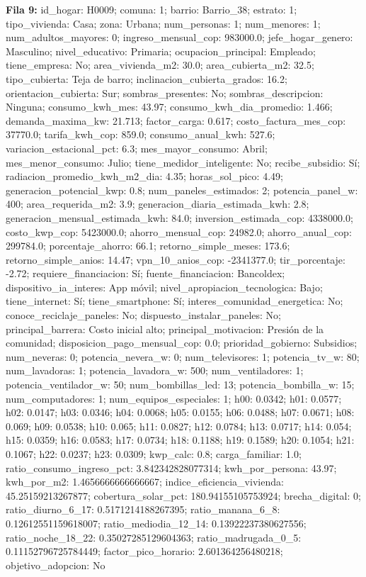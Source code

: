 {\footnotesize\textbf{Fila 9:} id\_hogar: H0009; comuna: 1; barrio: Barrio\_38; estrato: 1; tipo\_vivienda: Casa; zona: Urbana; num\_personas: 1; num\_menores: 1; num\_adultos\_mayores: 0; ingreso\_mensual\_cop: 983000.0; jefe\_hogar\_genero: Masculino; nivel\_educativo: Primaria; ocupacion\_principal: Empleado; tiene\_empresa: No; area\_vivienda\_m2: 30.0; area\_cubierta\_m2: 32.5; tipo\_cubierta: Teja de barro; inclinacion\_cubierta\_grados: 16.2; orientacion\_cubierta: Sur; sombras\_presentes: No; sombras\_descripcion: Ninguna; consumo\_kwh\_mes: 43.97; consumo\_kwh\_dia\_promedio: 1.466; demanda\_maxima\_kw: 21.713; factor\_carga: 0.617; costo\_factura\_mes\_cop: 37770.0; tarifa\_kwh\_cop: 859.0; consumo\_anual\_kwh: 527.6; variacion\_estacional\_pct: 6.3; mes\_mayor\_consumo: Abril; mes\_menor\_consumo: Julio; tiene\_medidor\_inteligente: No; recibe\_subsidio: Sí; radiacion\_promedio\_kwh\_m2\_dia: 4.35; horas\_sol\_pico: 4.49; generacion\_potencial\_kwp: 0.8; num\_paneles\_estimados: 2; potencia\_panel\_w: 400; area\_requerida\_m2: 3.9; generacion\_diaria\_estimada\_kwh: 2.8; generacion\_mensual\_estimada\_kwh: 84.0; inversion\_estimada\_cop: 4338000.0; costo\_kwp\_cop: 5423000.0; ahorro\_mensual\_cop: 24982.0; ahorro\_anual\_cop: 299784.0; porcentaje\_ahorro: 66.1; retorno\_simple\_meses: 173.6; retorno\_simple\_anios: 14.47; vpn\_10\_anios\_cop: -2341377.0; tir\_porcentaje: -2.72; requiere\_financiacion: Sí; fuente\_financiacion: Bancoldex; dispositivo\_ia\_interes: App móvil; nivel\_apropiacion\_tecnologica: Bajo; tiene\_internet: Sí; tiene\_smartphone: Sí; interes\_comunidad\_energetica: No; conoce\_reciclaje\_paneles: No; dispuesto\_instalar\_paneles: No; principal\_barrera: Costo inicial alto; principal\_motivacion: Presión de la comunidad; disposicion\_pago\_mensual\_cop: 0.0; prioridad\_gobierno: Subsidios; num\_neveras: 0; potencia\_nevera\_w: 0; num\_televisores: 1; potencia\_tv\_w: 80; num\_lavadoras: 1; potencia\_lavadora\_w: 500; num\_ventiladores: 1; potencia\_ventilador\_w: 50; num\_bombillas\_led: 13; potencia\_bombilla\_w: 15; num\_computadores: 1; num\_equipos\_especiales: 1; h00: 0.0342; h01: 0.0577; h02: 0.0147; h03: 0.0346; h04: 0.0068; h05: 0.0155; h06: 0.0488; h07: 0.0671; h08: 0.069; h09: 0.0538; h10: 0.065; h11: 0.0827; h12: 0.0784; h13: 0.0717; h14: 0.054; h15: 0.0359; h16: 0.0583; h17: 0.0734; h18: 0.1188; h19: 0.1589; h20: 0.1054; h21: 0.1067; h22: 0.0237; h23: 0.0309; kwp\_calc: 0.8; carga\_familiar: 1.0; ratio\_consumo\_ingreso\_pct: 3.842342828077314; kwh\_por\_persona: 43.97; kwh\_por\_m2: 1.4656666666666667; indice\_eficiencia\_vivienda: 45.25159213267877; cobertura\_solar\_pct: 180.94155105753924; brecha\_digital: 0; ratio\_diurno\_6\_17: 0.5171214188267395; ratio\_manana\_6\_8: 0.12612551159618007; ratio\_mediodia\_12\_14: 0.13922237380627556; ratio\_noche\_18\_22: 0.35027285129604363; ratio\_madrugada\_0\_5: 0.11152796725784449; factor\_pico\_horario: 2.601364256480218; objetivo\_adopcion: No\par}
